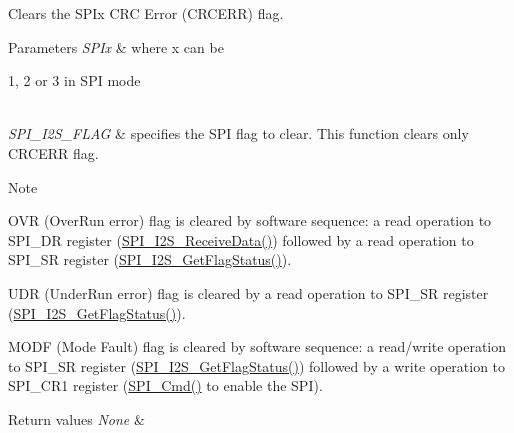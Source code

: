 Clears the S\+P\+Ix C\+RC Error (C\+R\+C\+E\+RR) flag. 


\begin{DoxyParams}{Parameters}
{\em S\+P\+Ix} & where x can be
\begin{DoxyItemize}
\item 1, 2 or 3 in S\+PI mode 
\end{DoxyItemize}\\
\hline
{\em S\+P\+I\+\_\+\+I2\+S\+\_\+\+F\+L\+AG} & specifies the S\+PI flag to clear. This function clears only C\+R\+C\+E\+RR flag. \\
\hline
\end{DoxyParams}
\begin{DoxyNote}{Note}

\begin{DoxyItemize}
\item O\+VR (Over\+Run error) flag is cleared by software sequence\+: a read operation to S\+P\+I\+\_\+\+DR register (\mbox{\hyperlink{group___s_p_i___private___functions_gab77de76547f3bff403236b263b070a30}{S\+P\+I\+\_\+\+I2\+S\+\_\+\+Receive\+Data()}}) followed by a read operation to S\+P\+I\+\_\+\+SR register (\mbox{\hyperlink{group___s_p_i___private___functions_ga1bd785d129e09c5734a876c8f2767204}{S\+P\+I\+\_\+\+I2\+S\+\_\+\+Get\+Flag\+Status()}}).
\item U\+DR (Under\+Run error) flag is cleared by a read operation to S\+P\+I\+\_\+\+SR register (\mbox{\hyperlink{group___s_p_i___private___functions_ga1bd785d129e09c5734a876c8f2767204}{S\+P\+I\+\_\+\+I2\+S\+\_\+\+Get\+Flag\+Status()}}).
\item M\+O\+DF (Mode Fault) flag is cleared by software sequence\+: a read/write operation to S\+P\+I\+\_\+\+SR register (\mbox{\hyperlink{group___s_p_i___private___functions_ga1bd785d129e09c5734a876c8f2767204}{S\+P\+I\+\_\+\+I2\+S\+\_\+\+Get\+Flag\+Status()}}) followed by a write operation to S\+P\+I\+\_\+\+C\+R1 register (\mbox{\hyperlink{group___s_p_i___private___functions_gaa31357879a65ee1ed7223f3b9114dcf3}{S\+P\+I\+\_\+\+Cmd()}} to enable the S\+PI). 
\end{DoxyItemize}
\end{DoxyNote}

\begin{DoxyRetVals}{Return values}
{\em None} & \\
\hline
\end{DoxyRetVals}
\mbox{\label{group___s_p_i___private___functions_ga35a524a49ff3d058137060f751e8749f}} 
